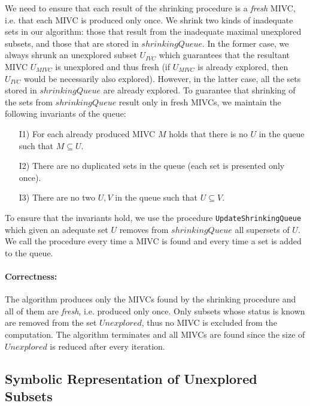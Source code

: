 We need to ensure that each result of the shrinking procedure is a \emph{fresh} MIVC, i.e. that each MIVC is produced only once.
We shrink two kinds of inadequate sets in our algorithm: those that result from the inadequate maximal unexplored subsets, and those that are stored in $\mathit{shrinkingQueue}$. In the former case, we always shrunk an unexplored subset $U_{\mathit{IVC}}$ which guarantees that the resultant MIVC $U_{\mathit{MIVC}}$ is unexplored and thus fresh (if $U_{\mathit{MIVC}}$ is already explored, then $U_{\mathit{IVC}}$ would be necessarily also explored).
However, in the latter case, all the sets stored in $\mathit{shrinkingQueue}$ are already explored. To guarantee that shrinking of the sets from $\mathit{shrinkingQueue}$ result only in fresh MIVCs, we maintain the following invariants of the queue:

\begin{itemize}
	\item[I1)] For each already produced MIVC $M$ holds that there is no $U$ in the queue such that $M \subseteq U$.
	\item[I2)] There are no duplicated sets in the queue (each set is presented only once).
	\item[I3)] There are no two $U, V$ in the queue such that $U \subseteq V$.
\end{itemize}

To ensure that the invariants hold, we use the procedure \texttt{UpdateShrinking\-Queue} which given an adequate set $U$ removes from $\mathit{shrinkingQueue}$ all supersets of $U$. We call the procedure every time a MIVC is found and every time a set is added to the queue.

\paragraph{Correctness:}
The algorithm produces only the MIVCs found by the shrinking procedure and all of them are \emph{fresh}, i.e. produced only once. Only subsets whose status is known are removed from the set $\mathit{Unexplored}$, thus no MIVC is excluded from the computation. The algorithm terminates and all MIVCs are found since the size of $\mathit{Unexplored}$ is reduced after every iteration.




\subsection{Symbolic Representation of Unexplored Subsets}
\label{sec:symbolic-representation}




